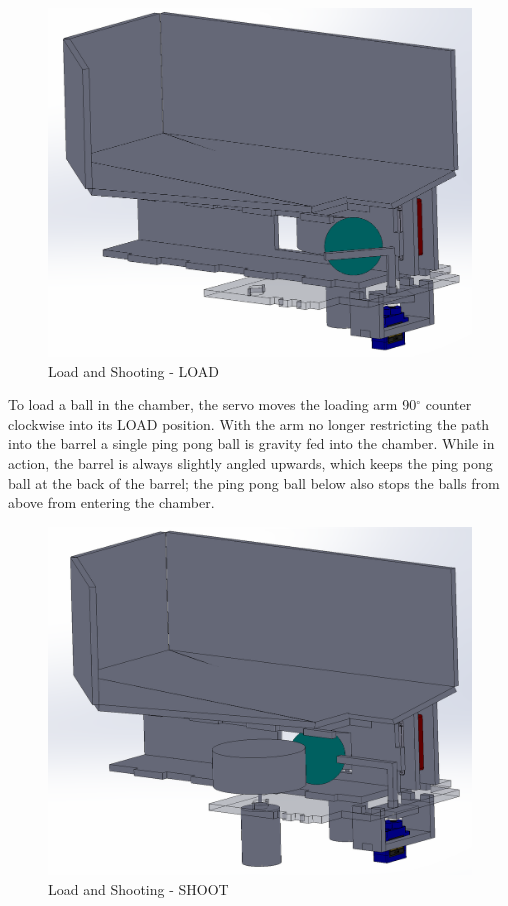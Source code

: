 \documentclass{article}
\begin{document}
\begin{figure}[H]
    \centering
    \includegraphics[width = 5in]{ShootLoadStep2.PNG}
    \caption{Load and Shooting - LOAD}
    \label{fig:ShootLoadStep2}
\end{figure}

To load a ball in the chamber, the servo moves the loading arm 90$^\circ$ counter clockwise into its LOAD position. With the arm no longer restricting the path into the barrel a single ping pong ball is gravity fed into the chamber. While in action, the barrel is always slightly angled upwards, which keeps the ping pong ball at the back of the barrel; the ping pong ball below also stops the balls from above from entering the chamber.

\begin{figure}[H]
    \centering
    \includegraphics[width = 5in]{ShootLoadStep3.PNG}
    \caption{Load and Shooting - SHOOT}
    \label{fig:ShootLoadStep3}
\end{figure}
\end{document}
